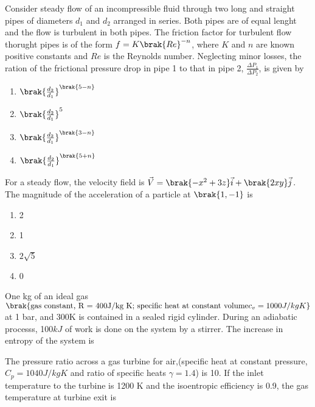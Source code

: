     \item Consider steady flow of an incompressible fluid through two long and straight pipes of 
        diameters $d_1$ and $d_2$ arranged in series. Both pipes are of equal lenght and the flow is 
        turbulent in both pipes. The friction factor for turbulent flow thorught pipes is of the form 
        $f = K\brak{Re}^{-n}$, where $K$ and $n$ are known positive constants and $Re$ is the Reynolds
        number. Neglecting minor losses, the ration of the frictional pressure drop in pipe 1 to 
        that in pipe 2, $\frac{\Delta P_1}{\Delta P_2}$, is given by
        \hfill{}

        \begin{multicols}{4}
            \begin{enumerate}
                \item $\brak{\frac{d_2}{d_1}}^{\brak{5-n}}$
                    \columnbreak
                \item $\brak{\frac{d_2}{d_1}}^5$
                    \columnbreak
                \item $\brak{\frac{d_2}{d_1}}^{\brak{3-n}}$
                    \columnbreak
                \item $\brak{\frac{d_2}{d_1}}^{\brak{5+n}}$
            \end{enumerate}
        \end{multicols}

    \item For a steady flow, the velocity field is $\vec{V} = \brak{-x^2 + 3z}\vec{i} + \brak{2xy}\vec{j}$.
        The magnitude of the acceleration of a particle at $\brak{1, -1}$ is
        \hfill{}
        \begin{multicols}{4}
            \begin{enumerate}
                \item 2
                    \columnbreak
                \item 1
                    \columnbreak
                \item $2\sqrt{5}$
                    \columnbreak
                \item 0
            \end{enumerate}
        \end{multicols}

    \item One kg of an ideal gas $\brak{\textnormal{gas constant, R = 400J/kg K; specific
        heat at constant volume} c_v = 1000 J/kg K}$ at 1 bar, and 300K is contained in a sealed rigid 
        cylinder. During an adiabatic processs, 100$kJ$ of work is done on the system by a stirrer. 
        The increase in entropy of the system is 
        \hfill{}
   \\     
    \item The pressure ratio across a gas turbine for air,(specific heat at constant pressure,$C_p = 1040J/kg K$ and ratio of specific heats $\gamma = 1.4$) is
        10. If the inlet temperature to the turbine is 1200 K and the isoentropic efficiency is 0.9, the gas 
        temperature at turbine exit is 
        \hfill{}
   \\     
        
